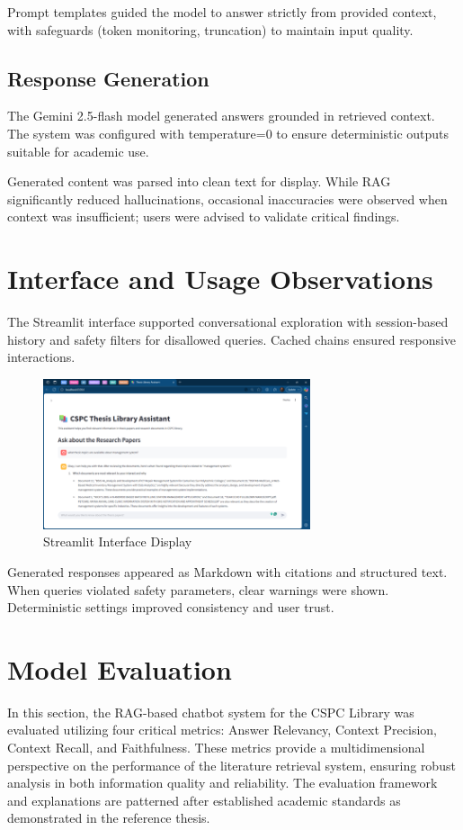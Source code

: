 \begin{refsection}
Prompt templates guided the model to answer strictly from provided context, with safeguards (token monitoring, truncation) to maintain input quality.

\subsection{Response Generation}

The Gemini 2.5-flash model generated answers grounded in retrieved context. The system was configured with temperature=0 to ensure deterministic outputs suitable for academic use.
 
Generated content was parsed into clean text for display. While RAG significantly reduced hallucinations, occasional inaccuracies were observed when context was insufficient; users were advised to validate critical findings.

\section{Interface and Usage Observations}

The Streamlit interface supported conversational exploration with session-based history and safety filters for disallowed queries. Cached chains ensured responsive interactions.

\begin{figure}[h]
    \centering
    \includegraphics[width=0.7\textwidth]{figures/streamlit.png}
    \caption{Streamlit Interface Display}
\end{figure}

Generated responses appeared as Markdown with citations and structured text. When queries violated safety parameters, clear warnings were shown. Deterministic settings improved consistency and user trust.

\section{Model Evaluation}
In this section, the RAG-based chatbot system for the CSPC Library was evaluated utilizing four critical metrics: Answer Relevancy, Context Precision, Context Recall, and Faithfulness. These metrics provide a multidimensional perspective on the performance of the literature retrieval system, ensuring robust analysis in both information quality and reliability. The evaluation framework and explanations are patterned after established academic standards as demonstrated in the reference thesis.


\end{refsection}
